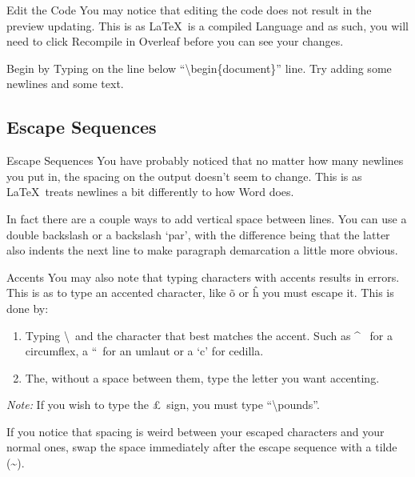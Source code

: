 \documentclass{beamer}
\begin{document}
\begin{frame}{Edit the Code}
You may notice that editing the code does not result in the preview updating. This is as \LaTeX~is a compiled Language and as such, you will need to click Recompile in Overleaf before you can see your changes.\par
Begin by Typing on the line below ``\textbackslash begin\{document\}'' line. Try adding some newlines and some text.
\end{frame}

\subsection{Escape Sequences}

\begin{frame}{Escape Sequences}
You have probably noticed that no matter how many newlines you put in, the spacing on the output doesn't seem to change. This is as \LaTeX~treats newlines a bit differently to how Word does.\par
In fact there are a couple ways to add vertical space between lines. You can use a double backslash or a backslash `par', with the difference being that the latter also indents the next line to make paragraph demarcation a little more obvious.
\end{frame}

\begin{frame}{Accents}
You may also note that typing characters with accents results in errors. This is as to type an accented character, like \~o or \^h you must escape it. This is done by:
\begin{enumerate}
\item Typing \textbackslash~and the character that best matches the accent. Such as \^~ for a circumflex, a ``~for an umlaut or a `c' for cedilla. 
\item The, without a space between them, type the letter you want accenting.
\end{enumerate}\par
\emph{Note:} If you wish to type the \pounds~sign, you must type ``\textbackslash pounds''.\par
If you notice that spacing is weird between your escaped characters and your normal ones, swap the space immediately after the escape sequence with a tilde (\textasciitilde).\par
\end{frame}
\end{document}
